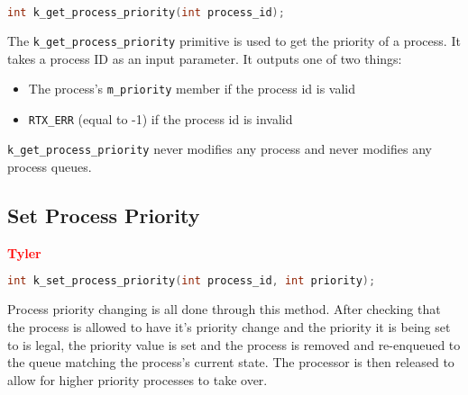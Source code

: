 \documentclass[12pt]{report}
\begin{document}
\begin{minipage}{\textwidth}
\begin{lstlisting}[language=C, frame=single]
int k_get_process_priority(int process_id);
\end{lstlisting}
\end{minipage}

The {\tt k\_get\_process\_priority} primitive is used to get the priority of a process. It takes a process ID as an input parameter. It outputs one of two things:\\

\begin{itemize}
\item The process's {\tt m\_priority} member if the process id is valid
\item {\tt RTX\_ERR} (equal to -1) if the process id is invalid
\end{itemize}

{\tt k\_get\_process\_priority} never modifies any process and never modifies any process queues.\\

\subsection{Set Process Priority}

\textcolor{red}{\textbf{Tyler}} \\
\begin{minipage}{\textwidth}
\begin{lstlisting}[language=C, frame=single]
int k_set_process_priority(int process_id, int priority);
\end{lstlisting}
\end{minipage}

Process priority changing is all done through this method. After checking that the process is allowed to have it's priority change and the priority it is being set to is legal, the priority value is set and the process is removed and re-enqueued to the queue matching the process's current state. The processor is then released to allow for higher priority processes to take over.

\begin{algorithm}
  \caption{The process priority changing function}
  \begin{algorithmic}[1]
		\EndIf
    \EndProcedure
  \end{algorithmic}
\end{algorithm}
\end{document}
